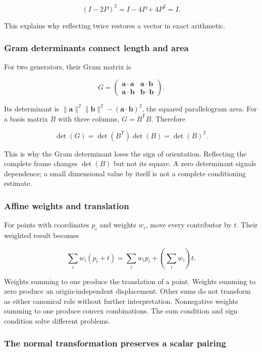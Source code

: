 \[
(I-2P)^2=I-4P+4P^2=I.
\]

This explains why reflecting twice restores a vector in exact arithmetic.

\subsubsection{Gram determinants connect length and area}\label{02-foundations-ii-ch039-gram-determinants-connect-length-and-area}

For two generators, their Gram matrix is

\[
G=\begin{pmatrix}\mathbf a\cdot\mathbf a&\mathbf a\cdot\mathbf b\\
\mathbf a\cdot\mathbf b&\mathbf b\cdot\mathbf b\end{pmatrix}.
\]

Its determinant is \(\|\mathbf a\|^2\|\mathbf b\|^2-(\mathbf a\cdot\mathbf b)^2\), the squared parallelogram area. For a basis matrix \(B\) with three columns, \(G=B^\mathsf TB\). Therefore

\[
\det(G)=\det(B^\mathsf T)\det(B)=\det(B)^2.
\]

This is why the Gram determinant loses the sign of orientation. Reflecting the complete frame changes \(\det(B)\) but not its square. A zero determinant signals dependence; a small dimensional value by itself is not a complete conditioning estimate.

\subsubsection{Affine weights and translation}\label{02-foundations-ii-ch039-affine-weights-and-translation}

For points with coordinates \(p_i\) and weights \(w_i\), move every contributor by \(t\). Their weighted result becomes

\[
\sum_iw_i(p_i+t)=\sum_iw_ip_i+\left(\sum_iw_i\right)t.
\]

Weights summing to one produce the translation of a point. Weights summing to zero produce an origin-independent displacement. Other sums do not transform as either canonical role without further interpretation. Nonnegative weights summing to one produce convex combinations. The sum condition and sign condition solve different problems.

\subsubsection{The normal transformation preserves a scalar pairing}\label{02-foundations-ii-ch039-the-normal-transformation-preserves-a-scalar-pairing}

